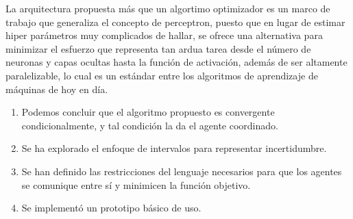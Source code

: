 \begin{conclusions}
    \label{sec:19}
        
            La arquitectura propuesta más que un algortimo optimizador es un marco de trabajo que generaliza el concepto de perceptron, puesto que en lugar de estimar 
            hiper parámetros muy complicados de hallar, se ofrece una alternativa para minimizar el esfuerzo que representa tan ardua tarea desde el número de neuronas y 
            capas ocultas hasta la función de activación, además de ser altamente paralelizable, lo cual es un estándar entre los algoritmos de aprendizaje de máquinas de 
            hoy en día. \\
            \begin{enumerate}
                \item Podemos concluir que el algoritmo propuesto es convergente condicionalmente, y tal condición la da el agente coordinado. 
                \item Se ha explorado el enfoque de intervalos para representar incertidumbre.
                \item Se han definido las restricciones del lenguaje necesarios para que los agentes se comunique entre sí y minimicen la función objetivo.
                \item Se implementó un prototipo básico de uso.
            \end{enumerate}
\end{conclusions}
